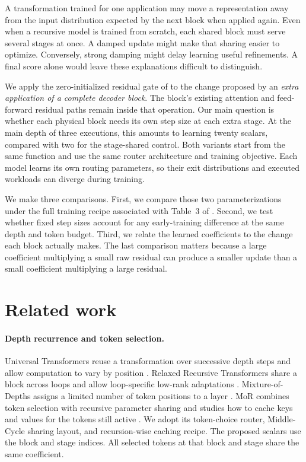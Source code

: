 \documentclass[11pt,letterpaper]{article}
\begin{document}
A transformation trained for one application may move a representation away from the input distribution expected by the next block when applied again. Even when a recursive model is trained from scratch, each shared block must serve several stages at once. A damped update might make that sharing easier to optimize. Conversely, strong damping might delay learning useful refinements. A final score alone would leave these explanations difficult to distinguish.

We apply the zero-initialized residual gate of \citet{rezero} to the change proposed by an \emph{extra application of a complete decoder block}. The block's existing attention and feed-forward residual paths remain inside that operation. Our main question is whether each physical block needs its own step size at each extra stage. At the main depth of three executions, this amounts to learning twenty scalars, compared with two for the stage-shared control. Both variants start from the same function and use the same router architecture and training objective. Each model learns its own routing parameters, so their exit distributions and executed workloads can diverge during training.

We make three comparisons. First, we compare those two parameterizations under the full training recipe associated with Table~3 of \citet{bae2025mor}. Second, we test whether fixed step sizes account for any early-training difference at the same depth and token budget. Third, we relate the learned coefficients to the change each block actually makes. The last comparison matters because a large coefficient multiplying a small raw residual can produce a smaller update than a small coefficient multiplying a large residual.

\section{Related work}
\paragraph{Depth recurrence and token selection.}
Universal Transformers reuse a transformation over successive depth steps and allow computation to vary by position \citep{universal}. Relaxed Recursive Transformers share a block across loops and allow loop-specific low-rank adaptations \citep{relaxed}. Mixture-of-Depths assigns a limited number of token positions to a layer \citep{mod}. MoR combines token selection with recursive parameter sharing and studies how to cache keys and values for the tokens still active \citep{bae2025mor}. We adopt its token-choice router, Middle-Cycle sharing layout, and recursion-wise caching recipe. The proposed scalars use the block and stage indices. All selected tokens at that block and stage share the same coefficient.
\end{document}
